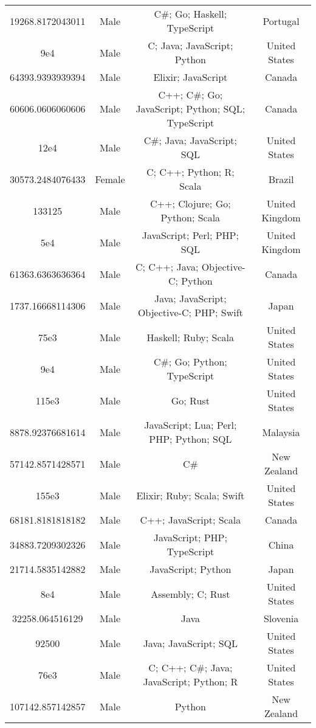 \begin{center}
\begin{tabular}{ |c|c|c|c| }
19268.8172043011  &  Male  &  C\#; Go; Haskell; TypeScript  &  Portugal  \\ 
9e4  &  Male  &  C; Java; JavaScript; Python  &  United States  \\ 
64393.9393939394  &  Male  &  Elixir; JavaScript  &  Canada  \\ 
60606.0606060606  &  Male  &  C++; C\#; Go; JavaScript; Python; SQL; TypeScript  &  Canada  \\ 
12e4  &  Male  &  C\#; Java; JavaScript; SQL  &  United States  \\ 
30573.2484076433  &  Female  &  C; C++; Python; R; Scala  &  Brazil  \\ 
133125  &  Male  &  C++; Clojure; Go; Python; Scala  &  United Kingdom  \\ 
5e4  &  Male  &  JavaScript; Perl; PHP; SQL  &  United Kingdom  \\ 
61363.6363636364  &  Male  &  C; C++; Java; Objective-C; Python  &  Canada  \\ 
1737.16668114306  &  Male  &  Java; JavaScript; Objective-C; PHP; Swift  &  Japan  \\ 
75e3  &  Male  &  Haskell; Ruby; Scala  &  United States  \\ 
9e4  &  Male  &  C\#; Go; Python; TypeScript  &  United States  \\ 
115e3  &  Male  &  Go; Rust  &  United States  \\ 
8878.92376681614  &  Male  &  JavaScript; Lua; Perl; PHP; Python; SQL  &  Malaysia  \\ 
57142.8571428571  &  Male  &  C\#  &  New Zealand  \\ 
155e3  &  Male  &  Elixir; Ruby; Scala; Swift  &  United States  \\ 
68181.8181818182  &  Male  &  C++; JavaScript; Scala  &  Canada  \\ 
34883.7209302326  &  Male  &  JavaScript; PHP; TypeScript  &  China  \\ 
21714.5835142882  &  Male  &  JavaScript; Python  &  Japan  \\ 
8e4  &  Male  &  Assembly; C; Rust  &  United States  \\ 
32258.064516129  &  Male  &  Java  &  Slovenia  \\ 
92500  &  Male  &  Java; JavaScript; SQL  &  United States  \\ 
76e3  &  Male  &  C; C++; C\#; Java; JavaScript; Python; R  &  United States  \\ 
107142.857142857  &  Male  &  Python  &  New Zealand  \\ 

\end{tabular}
\end{center}
